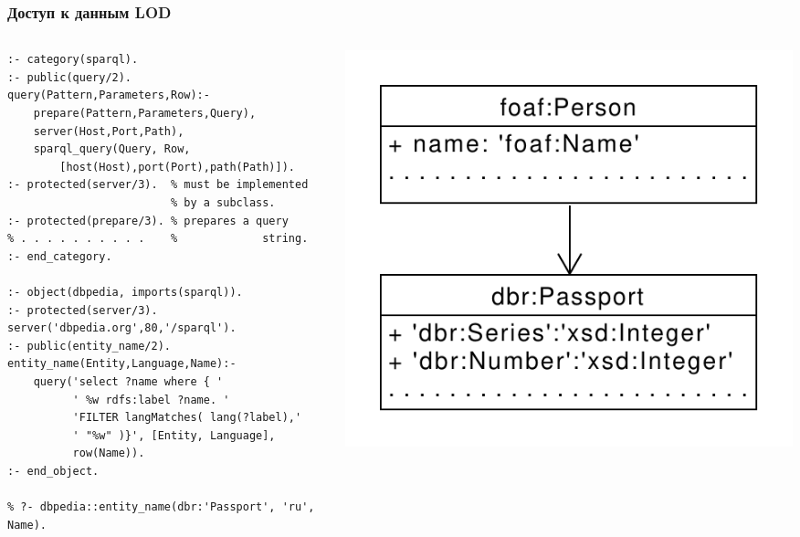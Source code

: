\documentclass[10pt]{beamer}
\begin{document}
\begin{frame}[fragile] \frametitle{Доступ к данным LOD}


  \begin{columns}
\begin{column}{0.5\textwidth}
\begin{verbatim}
:- category(sparql).
:- public(query/2).
query(Pattern,Parameters,Row):-
    prepare(Pattern,Parameters,Query),
    server(Host,Port,Path),
    sparql_query(Query, Row,
        [host(Host),port(Port),path(Path)]).
:- protected(server/3).  % must be implemented
                         % by a subclass.
:- protected(prepare/3). % prepares a query
% . . . . . . . . . .    %             string.
:- end_category.

:- object(dbpedia, imports(sparql)).
:- protected(server/3).
server('dbpedia.org',80,'/sparql').
:- public(entity_name/2).
entity_name(Entity,Language,Name):-
    query('select ?name where { '
          ' %w rdfs:label ?name. '
          'FILTER langMatches( lang(?label),'
          ' "%w" )}', [Entity, Language],
          row(Name)).
:- end_object.

% ?- dbpedia::entity_name(dbr:'Passport', 'ru', Name).
\end{verbatim}
\end{column}
\begin{column}{0.5\textwidth}
  \flushright
\includegraphics[width=0.8\linewidth]{simple-diag.pdf}
\end{column}
\end{columns}
 \end{frame}
\end{document}
